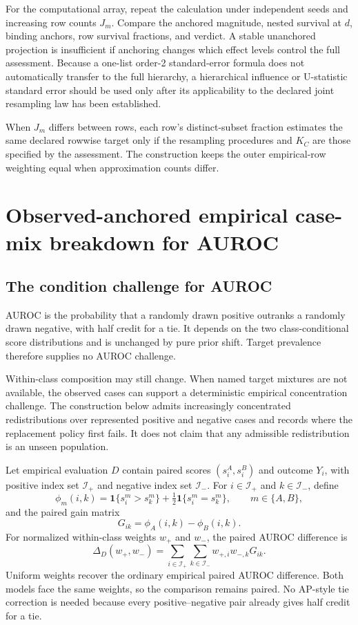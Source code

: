 \documentclass[11pt]{article}
\theoremstyle{remark}
\begin{document}
For the computational array, repeat the calculation under independent seeds
and increasing row counts $J_m$. Compare the anchored magnitude, nested
survival at $d$, binding anchors, row survival fractions, and verdict. A stable
unanchored projection is insufficient if anchoring changes which effect levels
control the full assessment. Because a one-list order-2 standard-error formula
does not automatically transfer to the full hierarchy, a hierarchical
influence or U-statistic standard error should be used only after its
applicability to the declared joint resampling law has been established.

When $J_m$ differs between rows, each row's distinct-subset fraction estimates
the same declared rowwise target only if the resampling procedures and $K_C$
are those specified by the assessment. The construction keeps the outer
empirical-row weighting equal when approximation counts differ.


\section{Observed-anchored empirical case-mix breakdown for AUROC}
\label{app:auroc}

\subsection{The condition challenge for AUROC}

AUROC is the probability that a randomly drawn positive outranks a randomly
drawn negative, with half credit for a tie. It depends on the two
class-conditional score distributions and is unchanged by pure prior shift.
Target prevalence therefore supplies no AUROC challenge.

Within-class composition may still change. When named target mixtures are not
available, the observed cases can support a deterministic empirical
concentration challenge. The construction below admits increasingly
concentrated redistributions over represented positive and negative cases and
records where the replacement policy first fails. It does not claim that any
admissible redistribution is an unseen population.

Let empirical evaluation $D$ contain paired scores $(s_i^A,s_i^B)$ and outcome
$Y_i$, with positive index set $\mathcal I_+$ and negative index set
$\mathcal I_-$. For $i\in\mathcal I_+$ and $k\in\mathcal I_-$, define
\[
\phi_m(i,k)
=
\mathbf 1\{s_i^m>s_k^m\}
+\tfrac12\mathbf 1\{s_i^m=s_k^m\},
\qquad m\in\{A,B\},
\]
and the paired gain matrix
\[
G_{ik}=\phi_A(i,k)-\phi_B(i,k).
\]
For normalized within-class weights $w_+$ and $w_-$, the paired AUROC
difference is
\begin{equation}
\Delta_D(w_+,w_-)
=
\sum_{i\in\mathcal I_+}
\sum_{k\in\mathcal I_-}
w_{+,i}w_{-,k}G_{ik}.
\label{eq:auroc-weighted}
\end{equation}
Uniform weights recover the ordinary empirical paired AUROC difference. Both
models face the same weights, so the comparison remains paired. No AP-style
tie correction is needed because every positive--negative pair already gives
half credit for a tie.
\end{document}
